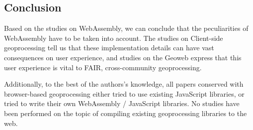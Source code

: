 \subsection{Conclusion}

Based on the studies on WebAssembly, we can conclude that the peculiarities of WebAssembly have to be taken into account. The studies on Client-side geoprocessing tell us that these implementation details can have vast consequences on user experience, and studies on the Geoweb express that this user experience is vital to FAIR, cross-community geoprocessing.

Additionally, to the best of the authors's knowledge, all papers conserved with browser-based geoprocessing either tried to use existing JavaScript libraries, or tried to write their own WebAssembly / JavaScript libraries. No studies have been performed on the topic of compiling existing geoprocessing libraries to the web. 